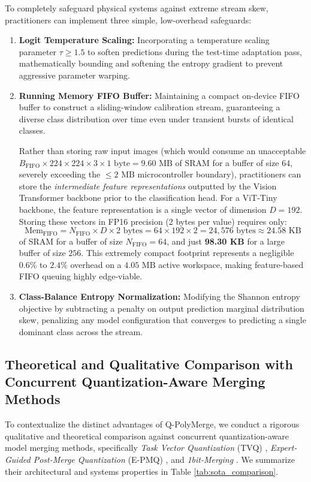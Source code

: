 To completely safeguard physical systems against extreme stream skew, practitioners can implement three simple, low-overhead safeguards:
\begin{enumerate}
    \item \textbf{Logit Temperature Scaling:} Incorporating a temperature scaling parameter $\tau \ge 1.5$ to soften predictions during the test-time adaptation pass, mathematically bounding and softening the entropy gradient to prevent aggressive parameter warping.
    \item \textbf{Running Memory FIFO Buffer:} Maintaining a compact on-device FIFO buffer to construct a sliding-window calibration stream, guaranteeing a diverse class distribution over time even under transient bursts of identical classes. 
    
    Rather than storing raw input images (which would consume an unacceptable $B_{\text{FIFO}} \times 224 \times 224 \times 3 \times 1 \text{ byte} = 9.60 \text{ MB}$ of SRAM for a buffer of size $64$, severely exceeding the $\le 2$ MB microcontroller boundary), practitioners can store the \emph{intermediate feature representations} outputted by the Vision Transformer backbone prior to the classification head. 
    For a ViT-Tiny backbone, the feature representation is a single vector of dimension $D = 192$. Storing these vectors in FP16 precision (2 bytes per value) requires only:
    \begin{equation}
    \text{Mem}_{\text{FIFO}} = N_{\text{FIFO}} \times D \times 2 \text{ bytes} = 64 \times 192 \times 2 = 24,576 \text{ bytes} \approx 24.58 \text{ KB}
    \end{equation}
    of SRAM for a buffer of size $N_{\text{FIFO}} = 64$, and just \textbf{98.30 KB} for a large buffer of size $256$. This extremely compact footprint represents a negligible $0.6\%$ to $2.4\%$ overhead on a $4.05 \text{ MB}$ active workspace, making feature-based FIFO queuing highly edge-viable.
    \item \textbf{Class-Balance Entropy Normalization:} Modifying the Shannon entropy objective by subtracting a penalty on output prediction marginal distribution skew, penalizing any model configuration that converges to predicting a single dominant class across the stream.
\end{enumerate}

\subsection{Theoretical and Qualitative Comparison with Concurrent Quantization-Aware Merging Methods}
To contextualize the distinct advantages of Q-PolyMerge, we conduct a rigorous qualitative and theoretical comparison against concurrent quantization-aware model merging methods, specifically \emph{Task Vector Quantization} (TVQ) \cite{tvq2025}, \emph{Expert-Guided Post-Merge Quantization} (E-PMQ) \cite{epmq2026}, and \emph{1bit-Merging} \cite{onebitmerging2025}. We summarize their architectural and systems properties in Table \ref{tab:sota_comparison}.

